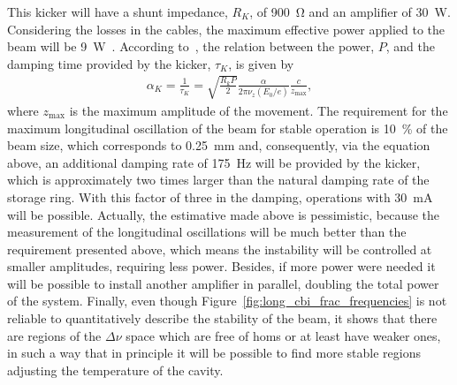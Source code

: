    This kicker will have a shunt impedance, $R_K$, of \SI{900}{\ohm} and an amplifier of \SI{30}{\watt}. Considering the losses in the cables, the maximum effective power applied to the beam will be \SI{9}{\watt}~\cite{Duarte2018}. According to~, the relation between the power, $P$, and the damping time provided by the kicker, $\tau_K$, is given by
    \begin{align}
        \alpha_K = \frac{1}{\tau_K} =
        \sqrt{\frac{R_kP}{2}}\frac{\alpha}{2\pi\nu_z(E_0/e)}\frac{c}{z_\text{max}},
    \end{align}
    where $z_\text{max}$ is the maximum amplitude of the movement. The requirement for the maximum longitudinal oscillation of the beam for stable operation is \SI{10}{\percent} of the beam size, which corresponds to \SI{0.25}{\milli\meter} and, consequently, via the equation above, an additional damping rate of \SI{175}{\hertz} will be provided by the kicker, which is approximately two times larger than the natural damping rate of the storage ring. With this factor of three in the damping, operations with \SI{30}{\milli\ampere} will be possible. Actually, the estimative made above is pessimistic, because the measurement of the longitudinal oscillations will be much better than the requirement presented above, which means the instability will be controlled at smaller amplitudes, requiring less power. Besides, if more power were needed it will be possible to install another amplifier in parallel, doubling the total power of the system. Finally, even though Figure~\ref{fig:long_cbi_frac_frequencies} is not reliable to quantitatively describe the stability of the beam, it shows that there are regions of the $\Delta \nu$ space which are free of \glspl{hom} or at least have weaker ones, in such a way that in principle it will be possible to find more stable regions adjusting the temperature of the cavity.

